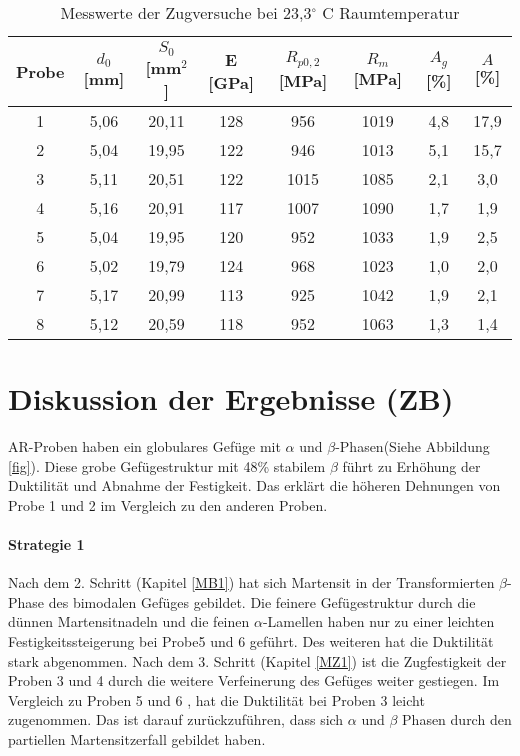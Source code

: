 \begin{table}
	\centering
	\begin{tabular}{|c|c|c|c|c|c|c|c|}
		\hline
		Probe & $d_0$ [mm] & $S_0$ [mm$^2$] & E [GPa] & $R_{p0,2}$ [MPa]& $R_m$ [MPa]& $A_g$ [\%]& $A$ [\%]\\
		\hline
		1 & 5,06 & 20,11 & 128 & 956 & 1019&4,8&17,9 \\
		\hline
		2 &5,04&19,95&122&946&1013&5,1&15,7\\
		\hline
		3 & 5,11&20,51& 122&1015&1085&2,1&3,0\\
		\hline
		4 &5,16& 20,91& 117 & 1007& 1090& 1,7&  1,9 \\
		\hline
		5&5,04 &19,95& 120& 952& 1033& 1,9 &2,5\\
		\hline
		6 &5,02& 19,79& 124& 968& 1023 &1,0 & 2,0\\
		\hline
		7&5,17& 20,99& 113& 925& 1042& 1,9& 2,1\\
		\hline
		8 & 5,12 & 20,59 & 118 & 952 & 1063 & 1,3 & 1,4\\
		\hline
	\end{tabular}
	\label{tab:zugversuche}
	\caption{Messwerte der Zugversuche bei 23,3$^\circ$ C Raumtemperatur}
\end{table}

\section{Diskussion der Ergebnisse (ZB)}
AR-Proben haben ein globulares Gefüge mit $\alpha$ und $\beta$-Phasen(Siehe Abbildung \ref{fig}). Diese grobe Gefügestruktur mit 48\% stabilem $\beta$ führt zu Erhöhung der Duktilität und Abnahme der Festigkeit. Das erklärt die höheren Dehnungen von Probe 1 und 2 im Vergleich zu den anderen Proben.

\paragraph{Strategie 1}
Nach dem 2. Schritt (Kapitel \ref{MB1}) hat sich Martensit in der Transformierten $\beta$-Phase des bimodalen Gefüges gebildet. Die feinere Gefügestruktur  durch die dünnen Martensitnadeln und die feinen $\alpha$-Lamellen  haben nur zu einer leichten Festigkeitssteigerung bei Probe5 und 6 geführt. Des weiteren hat die Duktilität stark  abgenommen.
Nach dem 3. Schritt (Kapitel \ref{MZ1}) ist die Zugfestigkeit der Proben 3 und 4 durch die weitere Verfeinerung des Gefüges weiter gestiegen. Im Vergleich zu Proben 5 und 6 , hat die Duktilität bei Proben 3 leicht zugenommen. Das ist  darauf zurückzuführen, dass sich  $\alpha$ und  $\beta$ Phasen durch den partiellen Martensitzerfall gebildet haben.


